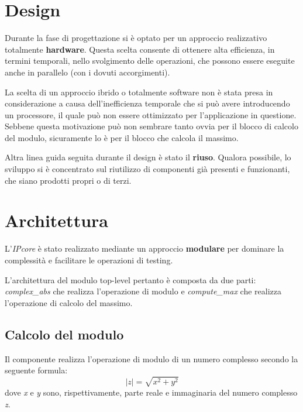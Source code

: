 \documentclass[12pt,a4paper,twoside,openany]{book}
\newcommand\abs[1]{\left|#1\right|}
\begin{document}
\section{Design}
Durante la fase di progettazione si è optato per un approccio realizzativo totalmente \textbf{hardware}. Questa scelta consente di ottenere alta efficienza, in termini temporali, nello svolgimento delle operazioni, che possono essere eseguite anche in parallelo (con i dovuti accorgimenti). 

La scelta di un approccio ibrido o totalmente software non è stata presa in considerazione a causa dell'inefficienza temporale che si può avere introducendo un processore, il quale può non essere ottimizzato per l'applicazione in questione. Sebbene questa motivazione può non sembrare tanto ovvia per il blocco di calcolo del modulo, sicuramente lo è per il blocco che calcola il massimo.

Altra linea guida seguita durante il design è stato il \textbf{riuso}. Qualora possibile, lo sviluppo si è concentrato sul riutilizzo di componenti già presenti e funzionanti, che siano prodotti propri o di terzi.
\section{Architettura}
L'\textit{IPcore} è stato realizzato mediante un approccio \textbf{modulare} per dominare la complessità e facilitare le operazioni di testing.

L'architettura del modulo top-level pertanto è composta da due parti: \textit{complex\_abs} che realizza l'operazione di modulo e \textit{compute\_max} che realizza l'operazione di calcolo del massimo.


\subsection{Calcolo del modulo}
Il componente realizza l'operazione di modulo di un numero complesso secondo la seguente formula:
$$
\abs{z} = \sqrt{x^{2}+y^{2}}
$$
dove \textit{x} e \textit{y} sono, rispettivamente, parte reale e immaginaria del numero complesso \textit{z}.
\end{document}
